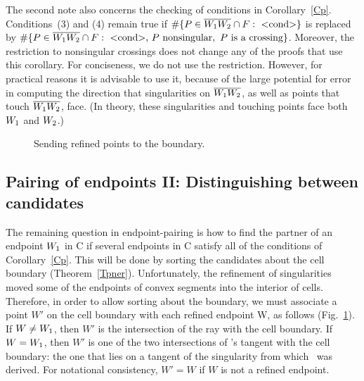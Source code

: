 The second note also concerns the checking of conditions in Corollary~\ref{Cp}.
Conditions~(3) and (4) remain true 
if $\#\{P \in \seg{W_{1}W_{2}} \cap F:\ \mbox{$<$cond$>$} \}$ 
is replaced by $\#\{P \in \seg{W_{1}W_{2}} \cap F:\ \mbox{$<$cond$>$},\,
P \mbox{ nonsingular},\ P \mbox{ is a crossing}\}$.  
Moreover, the restriction to nonsingular crossings does not change any of the 
proofs that
use this corollary.
For conciseness, we do not use the restriction.
However, for practical reasons it is advisable to use it,
because of the large potential for error in computing the direction that
singularities on $\mbox{$\overline{\mbox{$W_{1}$}\mbox{$W_{2}$}}$}$, as well as points that touch $\mbox{$\overline{\mbox{$W_{1}$}\mbox{$W_{2}$}}$}$, face.
(In theory, these singularities and touching points face both $\mbox{$W_{1}$}$ and $\mbox{$W_{2}$}$.)

\begin{figure}[htbp]\vspace{3.5in}\caption{Sending refined points to the boundary.}\label{3.J}\end{figure}

\subsection{Pairing of endpoints II: Distinguishing between candidates}
\label{sspII}

The remaining question in endpoint-pairing is how to find the partner 
of an endpoint $\mbox{$W_{1}$}$ in C if several endpoints in C satisfy all of the 
conditions of Corollary~\ref{Cp}.  
This will be done by sorting the candidates about the cell boundary
(Theorem~\ref{Tpner}).
Unfortunately, the refinement of singularities moved some of the endpoints 
of convex segments into the interior of cells.  
Therefore, in order to allow sorting about the boundary, we must associate 
a point $W'$ on the cell boundary with each refined endpoint W, as follows
(Fig.~\ref{3.J}).
If $W \neq \mbox{$W_{1}$}$,  then $W'$ is the intersection of the ray  
with the cell boundary.
%
%
If $W = \mbox{$W_{1}$}$, then $W'$ is one of the two intersections of \wo's tangent with
the cell boundary: the one that lies on a tangent of the singularity
from which \wo\ was derived.
For notational consistency, $W' = W$ if $W$ is not a refined endpoint.

